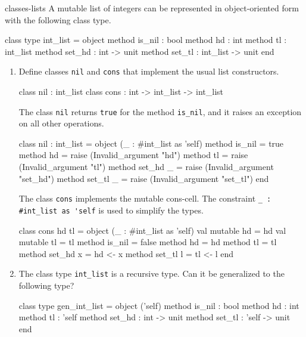 %
\begin{exercise}{classes-lists}
A mutable list of integers can be represented in object-oriented form with the following class type.

\begin{ocaml}
class type int_list =
object
    method is_nil : bool
    method hd : int
    method tl : int_list
    method set_hd : int -> unit
    method set_tl : int_list -> unit
end
\end{ocaml}
%
\begin{enumerate}
\item
Define classes \hbox{\lstinline/nil/} and \hbox{\lstinline/cons/} that implement the usual list constructors.

\begin{ocaml}
class nil : int_list
class cons : int -> int_list -> int_list
\end{ocaml}

\begin{answer}\ifanswers
The class \hbox{\lstinline/nil/} returns \hbox{\lstinline/true/} for the method \hbox{\lstinline/is_nil/},
and it raises an exception on all other operations.

\begin{ocaml}
class nil : int_list =
object (_ : #int_list as 'self)
   method is_nil = true
   method hd = raise (Invalid_argument "hd")
   method tl = raise (Invalid_argument "tl")
   method set_hd _ = raise (Invalid_argument "set_hd")
   method set_tl _ = raise (Invalid_argument "set_tl")
end
\end{ocaml}
%
The class \hbox{\lstinline/cons/} implements the mutable cons-cell.
The constraint \hbox{\lstinline/_ : #int_list as 'self/} is used to simplify
the types.

\begin{ocaml}
class cons hd tl =
object (_ : #int_list as 'self)
   val mutable hd = hd
   val mutable tl = tl
   method is_nil = false
   method hd = hd
   method tl = tl
   method set_hd x = hd <- x
   method set_tl l = tl <- l
end
\end{ocaml}
\fi\end{answer}

\item

The class type \hbox{\lstinline/int_list/} is a recursive type.  Can it be generalized to the following type?

\begin{ocaml}
class type gen_int_list =
object ('self)
    method is_nil : bool
    method hd : int
    method tl : 'self
    method set_hd : int -> unit
    method set_tl : 'self -> unit
end
\end{ocaml}


\end{enumerate}
\end{exercise}
